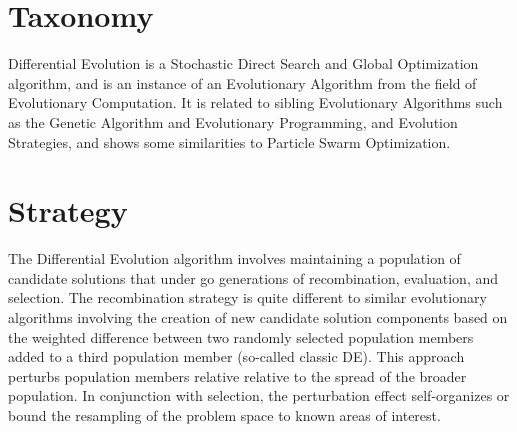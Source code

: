 \documentclass[a4paper, 11pt]{article}
\begin{document}
\section{Taxonomy}
\label{sec:taxonomy}
Differential Evolution is a Stochastic Direct Search and Global Optimization algorithm, and is an instance of an Evolutionary Algorithm from the field of Evolutionary Computation.
It is related to sibling Evolutionary Algorithms such as the Genetic Algorithm and Evolutionary Programming, and Evolution Strategies, and shows some similarities to Particle Swarm Optimization.

\section{Strategy}
\label{sec:strategy}

The Differential Evolution algorithm involves maintaining a population of candidate solutions that under go generations of recombination, evaluation, and selection. The recombination strategy is quite different to similar evolutionary algorithms involving the creation of new candidate solution components based on the weighted difference between two randomly selected population members added to a third population member (so-called classic DE). This approach perturbs population members relative relative to the spread of the broader population. In conjunction with selection, the perturbation effect self-organizes or bound the resampling of the problem space to known areas of interest.
\end{document}
